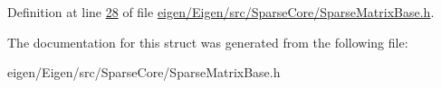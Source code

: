 Definition at line \hyperlink{eigen_2_eigen_2src_2_sparse_core_2_sparse_matrix_base_8h_source_l00028}{28} of file \hyperlink{eigen_2_eigen_2src_2_sparse_core_2_sparse_matrix_base_8h_source}{eigen/\+Eigen/src/\+Sparse\+Core/\+Sparse\+Matrix\+Base.\+h}.



The documentation for this struct was generated from the following file\+:\begin{DoxyCompactItemize}
\item 
eigen/\+Eigen/src/\+Sparse\+Core/\+Sparse\+Matrix\+Base.\+h\end{DoxyCompactItemize}
